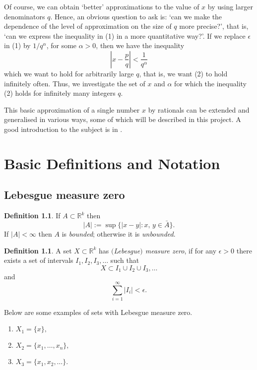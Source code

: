 \documentclass[reqno,openany,12pt]{amsbook}
\theoremstyle{definition}
\newtheorem{definition}[thm]{Definition}
\theoremstyle{remark}
\newcommand\al{\alpha}
\newcommand\ep{\epsilon}
\newcommand\R{\mathbb{R}}
\begin{document}
Of course, we can obtain
`better' approximations to the value of $x$ by using larger denominators
$q$.
Hence, an obvious question to ask is: `can we make the dependence of the
level of approximation on the size of $q$ more precise?',
that is,
`can we express the inequality in (1) in a more quantitative way?'.
If we replace $\ep$ in (1) by $1/{q^\al}$,
for some $\al > 0$,
then we have the inequality
\begin{equation} \label{first_approx.eq}
\left| {x-\frac{p}{q}}\right| <\frac{1}{q^\al}
\end{equation}
which we want to hold for arbitrarily large $q$,
that is, we want (2) to hold infinitely often.
Thus, we  investigate the set of $x$ and $\al$ for which the
inequality
(2) holds for infinitely many integers $q$.

This basic approximation of a single number $x$ by rationals can be
extended and generalised in various ways, some of which will be
described in this project.
A good introduction to the subject is in \cite{Cassels}.

\chapter{Basic Definitions and Notation}


\section{Lebesgue measure zero}


\begin{definition}
If $A \subset \R^k$ then
$$
|A| := \sup \{ |x-y| : x,\,y \in \bar A \}.
$$
If $|A| < \infty$ then $A$ is {\em bounded};
otherwise it is {\em unbounded}.
\end{definition}


\begin{definition}
A set $X \subset \R^k$ has {\em $($Lebesgue$)$ measure zero}, if for any
$\ep>0$ there exists a set of intervals $I_1,I_2,I_3,\dots$ such that
$$X\subset I_1\cup I_2\cup I_3,\dots$$
and
$$\sum_{i=1}^\infty |I_i|<\ep.$$
\end{definition}

Below are some examples of sets with Lebesgue measure zero.
\begin{enumerate}
\item
$X_1 =\lbrace x \rbrace,$
\item
$X_2 =\lbrace x_{1},\dots,x_{n}\rbrace,$
\item
$X_3 =\lbrace x_{1},x_{2},\dots \rbrace$.
\end{enumerate}
\end{document}
